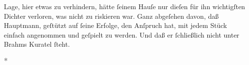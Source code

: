 {{                  Lage, hier etwas zu verhindern, hätte ſeinem Hauſe nur dieſen für ihn wichtigſten
                  Dichter verloren, was nicht zu riskieren war. Ganz abgeſehen davon, daß Hauptmann, geſtützt auf ſeine Erfolge, den
                  Anſpruch hat, mit jedem Stück einfach angenommen und geſpielt zu werden. Und daß
                  er ſchließlich nicht unter Brahms Kuratel
                  ſteht.}}\pend
           
\pstart
           \centering{}\textcolor{gray}{\textbf{*}}\pend
           
